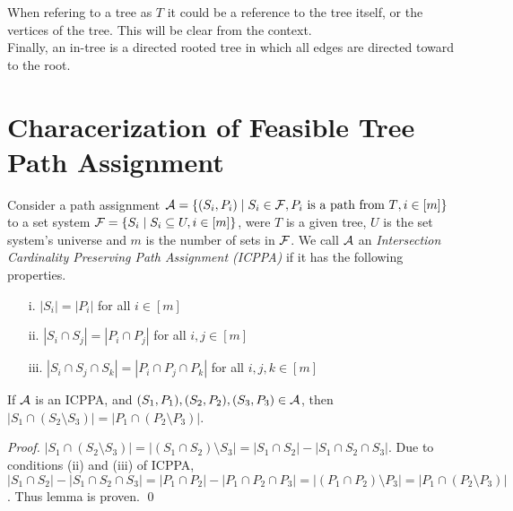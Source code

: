 \documentclass{llncs}
\def\cA{{\cal A}}
\def\cF{{\cal F}}
\begin{document}
\noindent
When refering to a tree as $T$ it could be a reference to the tree
itself, or the vertices of the tree. This will be clear from the
context.\\

\noindent
Finally, an in-tree is a directed rooted tree in which all edges are directed toward to the root.
\section{Characerization of Feasible Tree Path Assignment} \label{feasible}
Consider a path assignment $\cA = \{(S_i, P_i) \mid S_i \in \cF, P_i
\text{ is a path from $T$}, i \in [m]\}$ to a set system $\cF = \{S_i \mid S_i
\subseteq U, i \in [m]\}$, were $T$ is a given tree, $U$
is the set system's universe and $m$ is the number of sets in $\cF$. We call $\cA$ an {\em Intersection
Cardinality Preserving Path Assignment (ICPPA)} if it has the following properties.

\begin{enumerate}
\item [i.]  $|S_i| = |P_i|$ for all $i \in [m]$
\item [ii.] $|S_i \cap S_j| = |P_i \cap P_j|$ for all $i,j \in [m]$
\item [iii.] $|S_i \cap S_j \cap S_k| = |P_i \cap P_j \cap P_k|$ for all $i,j,k \in [m]$
\end{enumerate}

\begin{lemma}
\label{lem:setminuscard}
  If $\cA$ is an ICPPA, and $(S_1, P_1),(S_2, P_2),(S_3, P_3) \in
  \cA$, then $|S_1 \cap (S_2 \setminus S_3)| = |P_1 \cap (P_2 \setminus P_3)|$.
\end{lemma}
\begin{proof}
$|S_1 \cap (S_2 \setminus S_3)| = |(S_1 \cap S_2) \setminus S_3| =
|S_1 \cap S_2| - |S_1 \cap S_2 \cap S_3|$. Due to conditions (ii) and (iii) of
ICPPA, $|S_1 \cap S_2| - |S_1 \cap S_2 \cap S_3| = |P_1 \cap P_2| - |P_1 \cap P_2 \cap
P_3| = |(P_1 \cap P_2) \setminus P_3| =  |P_1 \cap (P_2 \setminus
P_3)|$. Thus lemma is proven. \qed
\end{proof}
\end{document}
